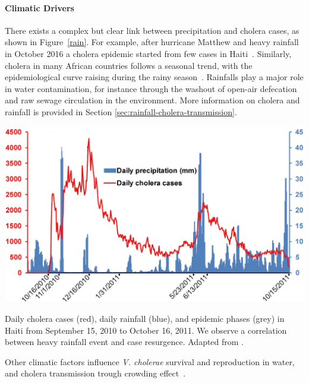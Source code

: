 \paragraph{Climatic Drivers} There exists a complex but clear link between precipitation and cholera cases, as shown in Figure~\ref{rain}. For example, after hurricane Matthew and heavy rainfall in October 2016 a cholera epidemic started from few cases in Haiti~\cite{rinaldo_reassessment_2012, gaudart_spatio-temporal_2013}. Similarly, cholera in many African countries follows a seasonal trend, with the epidemiological curve raising during the rainy season~\cite{baracchini_seasonality_2017, pascual_cholera_2000}.  Rainfalls play a major role in water contamination, for instance through the washout of open-air defecation and raw sewage circulation in the environment. More information on cholera and rainfall is provided in Section \ref{sec:rainfall-cholera-transmission}.

\begin{marginfigure}
\centering
\includegraphics[width=\textwidth]{fig/cholera-rainfall.png}
\caption{Daily cholera cases (red), daily rainfall (blue), and epidemic phases (grey) in Haiti from September 15, 2010 to October
16, 2011. We observe a correlation between heavy rainfall event and case resurgence. Adapted from .}
\label{rain}
\end{marginfigure}

Other climatic factors influence \textit{V. cholerae} survival and reproduction in water, and cholera transmission trough crowding effect~\cite{koelle_refractory_2005}.

